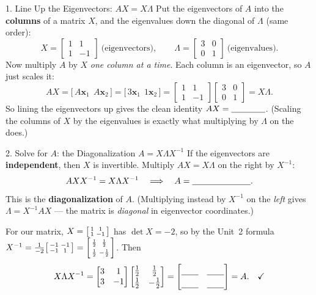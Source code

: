 \documentclass[10pt]{article}
\newcommand{\xx}{\mathbf{x}}
\begin{document}
\begin{notesbox}{1. Line Up the Eigenvectors: $AX=X\Lambda$}
Put the eigenvectors of $A$ into the \textbf{columns} of a matrix $X$, and the eigenvalues down the
diagonal of $\Lambda$ (same order):
\[
  X=\begin{bmatrix} 1 & 1\\ 1 & -1 \end{bmatrix}\ \text{(eigenvectors)},\qquad
  \Lambda=\begin{bmatrix} 3 & 0\\ 0 & 1 \end{bmatrix}\ \text{(eigenvalues)}.
\]
Now multiply $A$ by $X$ \emph{one column at a time}. Each column is an eigenvector, so $A$ just scales it:
\[
  AX=\big[\,A\xx_1\ \ A\xx_2\,\big]=\big[\,3\xx_1\ \ 1\xx_2\,\big]
  =\begin{bmatrix} 1 & 1\\ 1 & -1 \end{bmatrix}\begin{bmatrix} 3 & 0\\ 0 & 1 \end{bmatrix}=X\Lambda.
\]
So lining the eigenvectors up gives the clean identity $AX=\blank{1.4cm}$. (Scaling the columns of $X$
by the eigenvalues is exactly what multiplying by $\Lambda$ on the \blank{1.3cm} does.)
\end{notesbox}

\begin{notesbox}{2. Solve for $A$: the Diagonalization $A=X\Lambda X^{-1}$}
If the eigenvectors are \textbf{independent}, then $X$ is invertible. Multiply $AX=X\Lambda$ on the right
by $X^{-1}$:
\[
  AX X^{-1}=X\Lambda X^{-1}\quad\Longrightarrow\quad A=\blank{2.4cm}.
\]
This is the \textbf{diagonalization} of $A$. (Multiplying instead by $X^{-1}$ on the \emph{left} gives
$\Lambda=X^{-1}AX$ --- the matrix is \emph{diagonal} in eigenvector coordinates.)

\vspace{3pt}
For our matrix, $X=\begin{bsmallmatrix}1&1\\1&-1\end{bsmallmatrix}$ has $\det X=-2$, so by the Unit~2
formula $X^{-1}=\frac{1}{-2}\begin{bsmallmatrix}-1&-1\\-1&1\end{bsmallmatrix}=\begin{bsmallmatrix}\frac12&\frac12\\[2pt]\frac12&-\frac12\end{bsmallmatrix}$. Then
\[
  X\Lambda X^{-1}
  =\begin{bmatrix} 3 & 1\\ 3 & -1 \end{bmatrix}\begin{bmatrix} \tfrac12 & \tfrac12\\[2pt] \tfrac12 & -\tfrac12 \end{bmatrix}
  =\begin{bmatrix}\rule{0pt}{1.1em}\blank{0.7cm} & \blank{0.7cm}\\[3pt]\blank{0.7cm} & \blank{0.7cm}\end{bmatrix}=A.\quad\checkmark
\]
\end{notesbox}
\end{document}
